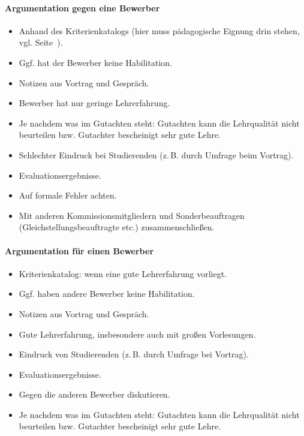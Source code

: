 \paragraph{Argumentation gegen eine Bewerber}
\begin{itemize}
    \item Anhand des Kriterienkatalogs (hier muss pädagogische Eignung drin stehen, vgl. Seite~\pageref{kriterienkatalog}).
    \item Ggf. hat der Bewerber keine Habilitation.
    \item Notizen aus Vortrag und Gespräch.
    \item Bewerber hat nur geringe Lehrerfahrung.
    \item Je nachdem was im Gutachten steht: Gutachten kann die Lehrqualität nicht beurteilen bzw. Gutachter bescheinigt sehr gute Lehre.
    \item Schlechter Eindruck bei Studierenden (z.\,B. durch Umfrage beim Vortrag).
    \item Evaluationsergebnisse.
    \item Auf formale Fehler achten.
    \item Mit anderen Kommissionsmitgliedern und Sonderbeauftragen (Gleichstellungsbeauftragte etc.) zusammenschließen.
\end{itemize}

\paragraph{Argumentation für einen Bewerber}
\begin{itemize}
    \item Kriterienkatalog: wenn eine gute Lehrerfahrung vorliegt.
    \item Ggf. haben andere Bewerber keine Habilitation.
    \item Notizen aus Vortrag und Gespräch.
    \item Gute Lehrerfahrung, insbesondere auch mit großen Vorlesungen.
    \item Eindruck von Studierenden (z.\,B. durch Umfrage bei Vortrag).
    \item Evaluationsergebnisse.
    \item Gegen die anderen Bewerber diskutieren.
    \item Je nachdem was im Gutachten steht: Gutachten kann die Lehrqualität nicht beurteilen bzw. Gutachter bescheinigt sehr gute Lehre.
\end{itemize}

